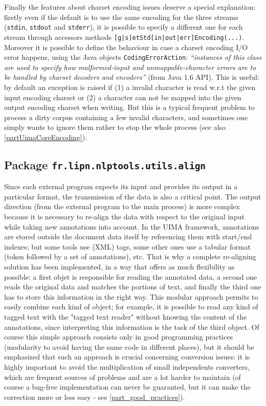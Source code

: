\documentclass{article}
\newcommand{\packname}{fr.lipn.nlptools}
\newcommand{\utilsPackname}{\packname.utils}
\begin{document}
\label{partUimaEncoding}
Finally the features about charset encoding issues deserve a special explanation: firstly even if the default is to use the same encoding for the three streams ({\tt stdin}, {\tt stdout} and {\tt stderr}), it is possible to specify a different one for each stream through accessors methods {\tt [g|s]etStd[in|out|err]Encoding(...)}. Moreover it is possible to define the behaviour in case a charset encoding I/O error happens, using the Java objects {\tt CodingErrorAction}: {\em ``instances of this class are used to specify how malformed-input and unmappable-character errors are to be handled by charset decoders and encoders''} (from Java 1.6 API). This is useful: by default an exception is raised if (1) a invalid character is read w.r.t the given input encoding charset or (2) a character can not be mapped into the given output encoding charset when writing. But this is a typical frequent problem to process a dirty corpus containing a few invalid characters, and sometimes one simply wants to ignore them rather to stop the whole process (see also \ref{partUimaCoreEncoding}). 


 



\subsection{Package {\tt \utilsPackname .align}}

\label{partAlign}
\label{part_align_package}

Since each external program expects its input and provides its output in a particular format, the transmission of the data is also a critical point. The output direction (from the external program to the main process) is more complex because it is necessary to re-align the data with respect to the original input while taking new annotations into account. In the UIMA framework, annotations are stored outside the document data itself by referencing them with start/end indexes; but some tools use (XML) tags, some other ones use a tabular format (token followed by a set of annotations), etc. That is why a complete re-aligning solution has been implemented, in a way that offers as much flexibility as possible: a first objet is responsible for reading the annotated data, a second one reads the original data and matches the portions of text, and finally the third one has to store this information in the right way. This modular approach permits to easily combine each kind of object; for example, it is possible to read any kind of tagged text with the "tagged text reader" without knowing the content of the annotations, since interpreting this information is the task of the third object. Of course this simple approach consists only in good programming practices (modularity to avoid having the same code in different places), but it should be emphasized that such an approach is crucial concerning conversion issues: it is highly important to avoid the multiplication of small independents converters, which are frequent sources of problems and are a lot harder to maintain (of course a bug-free implementation can never be guaranted, but it can make the correction more or less easy - see \ref{part_good_practices}).
\end{document}

